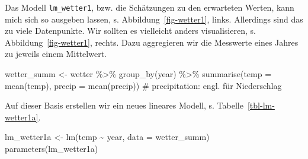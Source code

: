 \documentclass[
  letterpaper,
]{scrbook}
\newenvironment{Shaded}{\begin{snugshade}}{\end{snugshade}}
\newcommand{\AttributeTok}[1]{\textcolor[rgb]{0.40,0.45,0.13}{#1}}
\newcommand{\CommentTok}[1]{\textcolor[rgb]{0.37,0.37,0.37}{#1}}
\newcommand{\FunctionTok}[1]{\textcolor[rgb]{0.28,0.35,0.67}{#1}}
\newcommand{\NormalTok}[1]{\textcolor[rgb]{0.00,0.23,0.31}{#1}}
\newcommand{\OtherTok}[1]{\textcolor[rgb]{0.00,0.23,0.31}{#1}}
\newcommand{\SpecialCharTok}[1]{\textcolor[rgb]{0.37,0.37,0.37}{#1}}
\theoremstyle{definition}
\theoremstyle{definition}
\theoremstyle{definition}
\theoremstyle{remark}
\begin{document}
Das Modell \texttt{lm\_wetter1}, bzw. die Schätzungen zu den erwarteten
Werten, kann mich sich so ausgeben lassen, s.
Abbildung~\ref{fig-wetter1}, links. Allerdings sind das zu viele
Datenpunkte. Wir sollten es vielleicht anders visualisieren, s.
Abbildung~\ref{fig-wetter1}, rechts. Dazu aggregieren wir die Messwerte
eines Jahres zu jeweils einem Mittelwert.

\begin{Shaded}
\begin{Highlighting}[]
\NormalTok{wetter\_summ }\OtherTok{\textless{}{-}}
\NormalTok{  wetter }\SpecialCharTok{\%\textgreater{}\%} 
  \FunctionTok{group\_by}\NormalTok{(year) }\SpecialCharTok{\%\textgreater{}\%} 
  \FunctionTok{summarise}\NormalTok{(}\AttributeTok{temp =} \FunctionTok{mean}\NormalTok{(temp),}
            \AttributeTok{precip =} \FunctionTok{mean}\NormalTok{(precip))  }\CommentTok{\# precipitation: engl. für Niederschlag}
\end{Highlighting}
\end{Shaded}

Auf dieser Basis erstellen wir ein neues lineares Modell, s.
Tabelle~\ref{tbl-lm-wetter1a}.

\begin{Shaded}
\begin{Highlighting}[]
\NormalTok{lm\_wetter1a }\OtherTok{\textless{}{-}} \FunctionTok{lm}\NormalTok{(temp }\SpecialCharTok{\textasciitilde{}}\NormalTok{ year, }\AttributeTok{data =}\NormalTok{ wetter\_summ)}
\FunctionTok{parameters}\NormalTok{(lm\_wetter1a)}
\end{Highlighting}
\end{Shaded}
\end{document}
